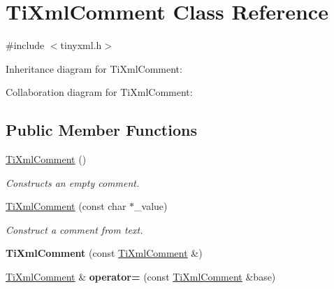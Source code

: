 \hypertarget{class_ti_xml_comment}{\section{Ti\+Xml\+Comment Class Reference}
\label{class_ti_xml_comment}
}


{\ttfamily \#include $<$tinyxml.\+h$>$}



Inheritance diagram for Ti\+Xml\+Comment\+:


Collaboration diagram for Ti\+Xml\+Comment\+:
\subsection*{Public Member Functions}
\begin{DoxyCompactItemize}
\item 
\hypertarget{class_ti_xml_comment_aaa3252031d3e8bd3a2bf51a1c61201b7}{\hyperlink{class_ti_xml_comment_aaa3252031d3e8bd3a2bf51a1c61201b7}{Ti\+Xml\+Comment} ()}\label{class_ti_xml_comment_aaa3252031d3e8bd3a2bf51a1c61201b7}

\begin{DoxyCompactList}\small\item\em Constructs an empty comment. \end{DoxyCompactList}\item 
\hypertarget{class_ti_xml_comment_a37e7802ef17bc03ebe5ae79bf0713d47}{\hyperlink{class_ti_xml_comment_a37e7802ef17bc03ebe5ae79bf0713d47}{Ti\+Xml\+Comment} (const char $\ast$\+\_\+value)}\label{class_ti_xml_comment_a37e7802ef17bc03ebe5ae79bf0713d47}

\begin{DoxyCompactList}\small\item\em Construct a comment from text. \end{DoxyCompactList}\item 
\hypertarget{class_ti_xml_comment_afaec41ac2760ce946ba1590eb5708e50}{{\bfseries Ti\+Xml\+Comment} (const \hyperlink{class_ti_xml_comment}{Ti\+Xml\+Comment} \&)}\label{class_ti_xml_comment_afaec41ac2760ce946ba1590eb5708e50}

\item 
\hypertarget{class_ti_xml_comment_aeceedc15f8b8f9ca0b6136696339b3ac}{\hyperlink{class_ti_xml_comment}{Ti\+Xml\+Comment} \& {\bfseries operator=} (const \hyperlink{class_ti_xml_comment}{Ti\+Xml\+Comment} \&base)}\label{class_ti_xml_comment_aeceedc15f8b8f9ca0b6136696339b3ac}


\end{DoxyCompactItemize}
